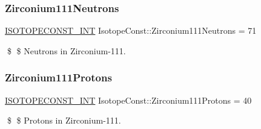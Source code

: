 \subsubsection{\texorpdfstring{Zirconium111\+Neutrons}{Zirconium111Neutrons}}
{\footnotesize\ttfamily \mbox{\hyperlink{group___isotope_const-_macros_ga5f18360b3e99483a35c32d789e62621c}{I\+S\+O\+T\+O\+P\+E\+C\+O\+N\+S\+T\+\_\+\+I\+NT}} Isotope\+Const\+::\+Zirconium111\+Neutrons = 71}

\$ \$ Neutrons in Zirconium-\/111. \mbox{\label{group___isotope_const-_zirconium-_zr111_gae8b0d92f84d1e851fed6685b80c57a18}} 
\subsubsection{\texorpdfstring{Zirconium111\+Protons}{Zirconium111Protons}}
{\footnotesize\ttfamily \mbox{\hyperlink{group___isotope_const-_macros_ga5f18360b3e99483a35c32d789e62621c}{I\+S\+O\+T\+O\+P\+E\+C\+O\+N\+S\+T\+\_\+\+I\+NT}} Isotope\+Const\+::\+Zirconium111\+Protons = 40}

\$ \$ Protons in Zirconium-\/111. 